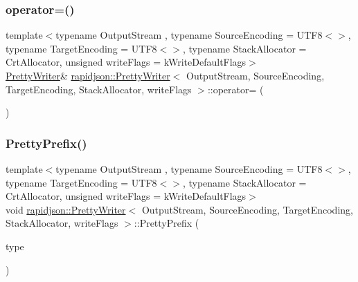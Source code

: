 \subsubsection{\texorpdfstring{operator=()}{operator=()}}
{\footnotesize\ttfamily template$<$typename Output\+Stream , typename Source\+Encoding  = U\+T\+F8$<$$>$, typename Target\+Encoding  = U\+T\+F8$<$$>$, typename Stack\+Allocator  = Crt\+Allocator, unsigned write\+Flags = k\+Write\+Default\+Flags$>$ \\
\mbox{\hyperlink{classrapidjson_1_1_pretty_writer}{Pretty\+Writer}}\& \mbox{\hyperlink{classrapidjson_1_1_pretty_writer}{rapidjson\+::\+Pretty\+Writer}}$<$ Output\+Stream, Source\+Encoding, Target\+Encoding, Stack\+Allocator, write\+Flags $>$\+::operator= (\begin{DoxyParamCaption}\item[{const \mbox{\hyperlink{classrapidjson_1_1_pretty_writer}{Pretty\+Writer}}$<$ Output\+Stream, Source\+Encoding, Target\+Encoding, Stack\+Allocator, write\+Flags $>$ \&}]{ }\end{DoxyParamCaption})\hspace{0.3cm}{\ttfamily [private]}}

\mbox{\label{classrapidjson_1_1_pretty_writer_aff11c26086470359ef3ab1142515441c}} 
\subsubsection{\texorpdfstring{PrettyPrefix()}{PrettyPrefix()}}
{\footnotesize\ttfamily template$<$typename Output\+Stream , typename Source\+Encoding  = U\+T\+F8$<$$>$, typename Target\+Encoding  = U\+T\+F8$<$$>$, typename Stack\+Allocator  = Crt\+Allocator, unsigned write\+Flags = k\+Write\+Default\+Flags$>$ \\
void \mbox{\hyperlink{classrapidjson_1_1_pretty_writer}{rapidjson\+::\+Pretty\+Writer}}$<$ Output\+Stream, Source\+Encoding, Target\+Encoding, Stack\+Allocator, write\+Flags $>$\+::Pretty\+Prefix (\begin{DoxyParamCaption}\item[{\mbox{\hyperlink{namespacerapidjson_ae79a4751c1c460ff0de5ecc07874f3e4}{Type}}}]{type }\end{DoxyParamCaption})\hspace{0.3cm}{\ttfamily [protected]}}



